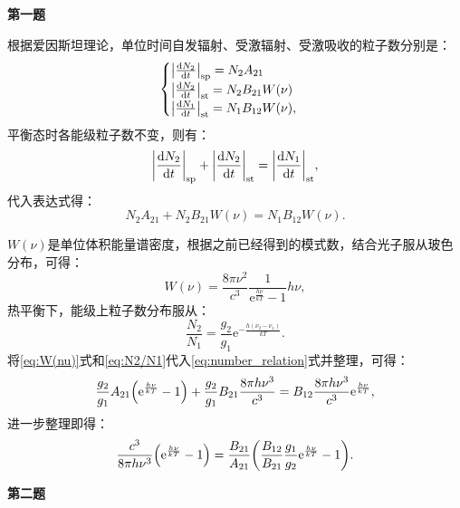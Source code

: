 \documentclass[12pt, a4paper, oneside]{ctexart}
\begin{document}
	\begin{center}
		\textbf{第一题}
	\end{center}
	
	根据爱因斯坦理论，单位时间自发辐射、受激辐射、受激吸收的粒子数分别是：
	$$
	\begin{cases}
		\abs{\dv{N_2}{t}}_{\mathrm{sp}} = N_2 A_{21} \\
		\abs{\dv{N_2}{t}}_{\mathrm{st}} = N_2 B_{21} W(\nu) \\ 
		\abs{\dv{N_1}{t}}_{\mathrm{st}} = N_1 B_{12} W(\nu),
	\end{cases}
	$$
	平衡态时各能级粒子数不变，则有：
	\begin{equation*}
		\abs{\dv{N_2}{t}}_{\mathrm{sp}} + \abs{\dv{N_2}{t}}_{\mathrm{st}} = \abs{\dv{N_1}{t}}_{\mathrm{st}}	,	
	\end{equation*}
	代入表达式得：
	\begin{equation}
		N_2 A_{21} + N_2 B_{21} W(\nu) = N_1 B_{12} W(\nu).
		\label{eq:number_relation}
	\end{equation}
	
	$W(\nu)$是单位体积能量谱密度，根据之前已经得到的模式数，结合光子服从玻色分布，可得：
	\begin{equation}
		W(\nu) = \frac{8 \pi \nu^2}{c^3} \frac{1}{\mathrm{e}^{\frac{h\nu}{kT}} - 1} h\nu,
		\label{eq:W(nu)}
	\end{equation}
	热平衡下，能级上粒子数分布服从：
	\begin{equation}
		\frac{N_2}{N_1} = \frac{g_2}{g_1} \mathrm{e}^{-\frac{h(\nu_2 - \nu_1)}{kT}} .
		\label{eq:N2/N1}
	\end{equation}
	将\eqref{eq:W(nu)}式和\eqref{eq:N2/N1}代入\eqref{eq:number_relation}式并整理，可得：
	\begin{equation*}
		\frac{g_2}{g_1} A_{21} \qty(\mathrm{e}^{\frac{h\nu}{kT}} - 1) +\frac{g_2}{g_1} B_{21} \frac{8\pi h \nu^3}{c^3} =   B_{12} \frac{8\pi h \nu^3}{c^3} \mathrm{e}^{\frac{h\nu}{kT}},
	\end{equation*}
	进一步整理即得：
	\begin{equation}
		\frac{c^3}{8\pi h \nu^3} \qty(\mathrm{e}^{\frac{h\nu}{kT}} - 1) = \frac{B_{21}}{A_{21}} \qty(\frac{B_{12}}{B_{21}} \frac{g_1}{g_2}\mathrm{e}^{\frac{h\nu}{kT}} - 1).
	\end{equation}
	
	\begin{center}
		\textbf{第二题}
	\end{center}
	
\end{document}
